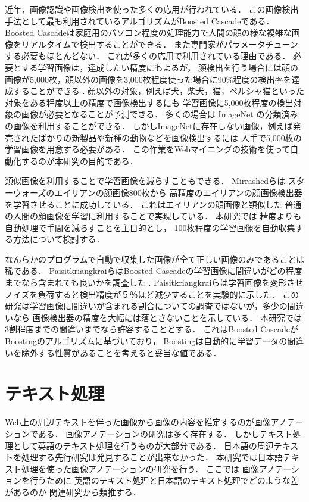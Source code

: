 近年，画像認識や画像検出を使った多くの応用が行われている．
この画像検出手法として最も利用されているアルゴリズムがBoosted Cascade\cite{Viola01rapidobject}である．
Boosted Cascadeは家庭用のパソコン程度の処理能力で人間の顔の様な複雑な画像をリアルタイムで検出することができる．
また専門家がパラメータチューンする必要もほとんどない．
これが多くの応用で利用されている理由である．
必要とする学習画像は，達成したい精度にもよるが，
顔検出を行う場合には顔の画像が5,000枚，顔以外の画像を3,000枚程度使った場合に90\%程度の検出率を達成することができる
\cite{Lienhart03empiricalanalysis}
.
顔以外の対象，例えば犬，柴犬，猫，ペルシャ猫といった対象をある程度以上の精度で画像検出するにも
学習画像に5,000枚程度の検出対象の画像が必要となることが予測できる．
多くの場合は
ImageNet\cite{imagenet}
の分類済みの画像を利用することができる．
しかしImageNetに存在しない画像，例えば発売されたばかりの新製品や新種の動物などを画像検出するには
人手で5,000枚の学習画像を用意する必要がある．
この作業をWebマイニングの技術を使って自動化するのが本研究の目的である．

類似画像を利用することで学習画像を減らすこともできる．
Mirrashed\cite{Mirrashed_2013_ICCV}らは
スターウォーズのエイリアンの顔画像800枚から
高精度のエイリアンの顔画像検出器を学習させることに成功している．
これはエイリアンの顔画像と類似した
普通の人間の顔画像を学習に利用することで実現している．
本研究では
精度よりも
自動処理で手間を減らすことを主目的とし，
100枚程度の学習画像を自動収集する方法について検討する．

なんらかのプログラムで自動で収集した画像が全て正しい画像のみであることは稀である．
PaisitkriangkraiらはBoosted Cascadeの学習画像に間違いがどの程度までなら含まれても良いかを調査した
\cite{DBLP:journals/corr/abs-1009-5758}
.
Paisitkriangkraiらは学習画像を変形させノイズを負荷すると検出精度が５％ほど減少することを実験的に示した．
この研究は学習画像に間違いが含まれる割合についての調査ではないが，多少の間違いなら
画像検出器の精度を大幅には落とさないことを示している．
本研究では3割程度までの間違いまでなら許容することとする．
これはBoosted CascadeがBoostingのアルゴリズムに基づいており，
Boostingは自動的に学習データの間違いを除外する性質があることを考えると妥当な値である．



\section{テキスト処理}

Web上の周辺テキストを伴った画像から画像の内容を推定するのが画像アノテーションである．
画像アノテーションの研究は多く存在する．
しかしテキスト処理として英語のテキスト処理を行うものが大部分である．
日本語の周辺テキストを処理する先行研究は発見することが出来なかった．
本研究では日本語テキスト処理を使った画像アノテーションの研究を行う．
%
ここでは
画像アノテーションを行うために
英語のテキスト処理と日本語のテキスト処理でどのような差があるのか
関連研究から類推する．

